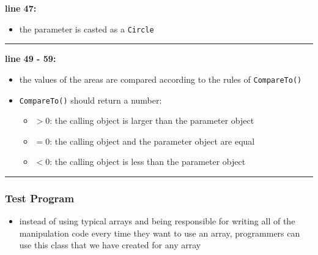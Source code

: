 \noindent
\begin{minipage}{0.15\textwidth}
    \textcolor{RedOrange}{\textbf{line  47:}}
\end{minipage}
\begin{minipage}{0.85\textwidth}
    \begin{itemize}
        \item[] the parameter is casted as a \texttt{Circle}
    \end{itemize}
\end{minipage}

\newpage

\vspace{0.1cm}
\noindent
\textcolor{RedOrange}{\rule{\textwidth}{0.5pt}}
\vspace{-0.1cm}

\noindent
\begin{minipage}{0.15\textwidth}
    \textcolor{RedOrange}{\textbf{line 49 - 59: }}
\end{minipage}
\begin{minipage}{0.85\textwidth}
    \begin{itemize}
        \item[] the values of the areas are compared according to the rules of \texttt{CompareTo()}
        \item[] \texttt{CompareTo()} should return a number:
            \begin{itemize}
                \item $>0$: the calling object is larger than the parameter object
                \item $=0$: the calling object and the parameter object are equal
                \item $<0$: the calling object is less than the parameter object
            \end{itemize}
    \end{itemize}
\end{minipage}

\vspace{0.5cm}
\noindent
\textcolor{RedOrange}{\rule{\textwidth}{0.5pt}}

\subsubsection{Test Program}


\begin{itemize}
    \item instead of using typical arrays and being responsible for writing all of the manipulation code every time they want to use an array, programmers can use this class that we have created for \textcolor{RedOrange}{any array}
\end{itemize}

